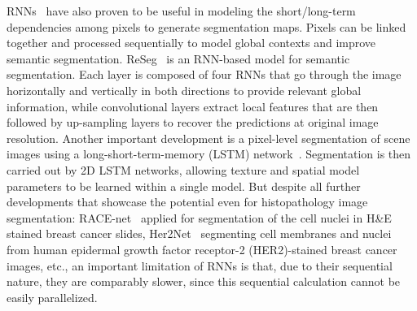 RNNs~\cite{rumelhart1986learning} have also proven to be useful in modeling the short/long-term dependencies among pixels to generate segmentation maps. Pixels can be linked together and processed sequentially to model global contexts and improve semantic segmentation. ReSeg~\cite{visin2016reseg} is an RNN-based model for semantic segmentation. Each layer is composed of four RNNs that go through the image horizontally and vertically in both directions to provide relevant global information, while convolutional layers extract local features that are then followed by up-sampling layers to recover the predictions at original image resolution. Another important development is a pixel-level segmentation of scene images using a long-short-term-memory (LSTM) network~\cite{byeon2015scene}. Segmentation is then carried out by 2D LSTM networks, allowing texture and spatial model parameters to be learned within a single model. But despite all further developments that showcase the potential even for histopathology image segmentation: RACE-net~\cite{chakravarty2018race} applied for segmentation of the cell nuclei in H\&E stained breast cancer slides, Her2Net~\cite{saha2018her2net} segmenting cell membranes and nuclei from human epidermal growth factor receptor-2 (HER2)-stained breast cancer images, etc., 
an important limitation of RNNs is that, due to their sequential nature, they are comparably slower, since this sequential calculation cannot be easily parallelized. 

